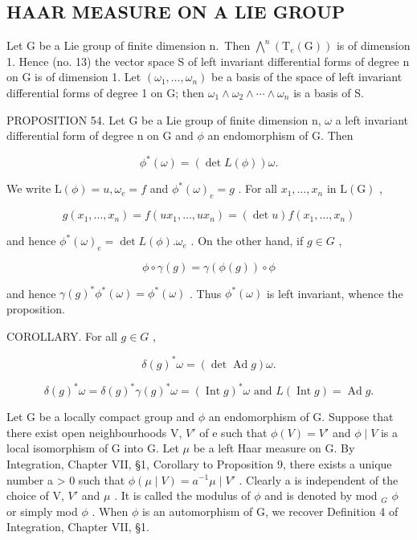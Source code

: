 \subsection{HAAR MEASURE ON A LIE GROUP}

Let G be a Lie group of finite dimension n.~Then \(\bigwedge^{n}(\mathrm{T}_{e}(\mathrm{G}))\) is of dimension 1. Hence (no. 13) the vector space S of left invariant differential forms of degree n on G is of dimension 1. Let \((\omega_{1},\ldots,\omega_{n})\) be a basis of the space of left invariant differential forms of degree 1 on G; then \(\omega_{1}\wedge\omega_{2}\wedge\cdots\wedge\omega_{n}\) is a basis of S.

PROPOSITION 54. Let G be a Lie group of finite dimension n, \(\omega\) a left invariant differential form of degree n on G and \(\phi\) an endomorphism of G. Then

\[
\phi^ {*} (\omega) = (\det L (\phi)) \omega .
\]

We write \(\mathrm{L}(\phi) = u, \omega_e = f\) and \(\phi^*(\omega)_e = g\) . For all \(x_1, \ldots, x_n\) in \(\mathrm{L}(\mathrm{G})\) ,

\[
g (x _ {1}, \dots , x _ {n}) = f (u x _ {1}, \dots , u x _ {n}) = (\det u) f (x _ {1}, \dots , x _ {n})
\]

and hence \(\phi^{*}(\omega)_{e} = \det L(\phi). \omega_{e}\) . On the other hand, if \(g \in G\) ,

\[
\phi \circ \gamma (g) = \gamma (\phi (g)) \circ \phi
\]

and hence \(\gamma(g)^{*}\phi^{*}(\omega)=\phi^{*}(\omega)\) . Thus \(\phi^{*}(\omega)\) is left invariant, whence the proposition.

COROLLARY. For all \(g \in G\) ,

\[
\delta (g) ^ {*} \omega = (\det \operatorname{Ad} g) \omega .
\]

\[
\delta (g) ^ {*} \omega = \delta (g) ^ {*} \gamma (g) ^ {*} \omega = (\operatorname{Int} g) ^ {*} \omega \text {   and   } L (\operatorname{Int} g) = \operatorname{Ad} g.
\]

Let G be a locally compact group and \(\phi\) an endomorphism of G. Suppose that there exist open neighbourhoods V, \(V'\) of e such that \(\phi(V) = V'\) and \(\phi \mid V\) is a local isomorphism of G into G. Let \(\mu\) be a left Haar measure on G. By Integration, Chapter VII, §1, Corollary to Proposition 9, there exists a unique number a \textgreater{} 0 such that \(\phi(\mu \mid V) = a^{-1}\mu \mid V'\) . Clearly a is independent of the choice of V, \(V'\) and \(\mu\) . It is called the modulus of \(\phi\) and is denoted by mod \(_{G}\) \(\phi\) or simply mod \(\phi\) . When \(\phi\) is an automorphism of G, we recover Definition 4 of Integration, Chapter VII, §1.

